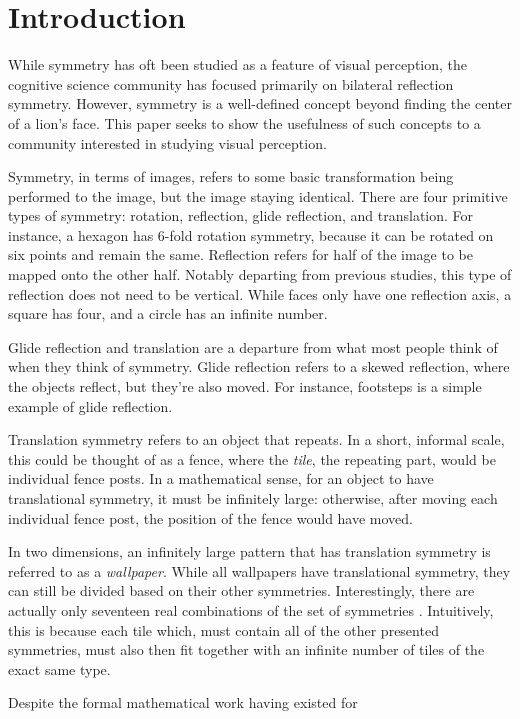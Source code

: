 \section{Introduction}
While symmetry has oft been studied as a feature of visual perception, the cognitive science community has focused primarily on bilateral reflection symmetry. However, symmetry is a well-defined concept beyond finding the center of a lion's face. This paper seeks to show the usefulness of such concepts to a community interested in studying visual perception.

Symmetry, in terms of images, refers to some basic transformation being performed to the image, but the image staying identical. There are four primitive types of symmetry: rotation, reflection, glide reflection, and translation. For instance, a hexagon has 6-fold rotation symmetry, because it can be rotated on six points and remain the same. Reflection refers for half of the image to be mapped onto the other half. Notably departing from previous studies, this type of reflection does not need to be vertical. While faces only have one reflection axis, a square has four, and a circle has an infinite number.

Glide reflection and translation are a departure from what most people think of when they think of symmetry. Glide reflection refers to a skewed reflection, where the objects reflect, but they're also moved. For instance, footsteps is a simple example of glide reflection.

Translation symmetry refers to an object that repeats. In a short, informal scale, this could be thought of as a fence, where the \textit{tile}, the repeating part, would be individual fence posts. In a mathematical sense, for an object to have translational symmetry, it must be infinitely large: otherwise, after moving each individual fence post, the position of the fence would have moved.

In two dimensions, an infinitely large pattern that has translation symmetry is referred to as a \textit{wallpaper}. While all wallpapers have translational symmetry, they can still be divided based on their other symmetries. Interestingly, there are actually only seventeen real combinations of the set of symmetries \cite{wallpaper_proof}. Intuitively, this is because each tile which, must contain all of the other presented symmetries, must also then fit together with an infinite number of tiles of the exact same type. 

Despite the formal mathematical work having existed for 

